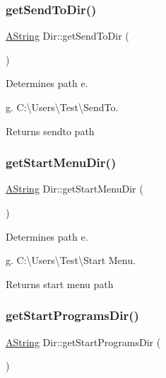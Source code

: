 \subsubsection{\texorpdfstring{getSendToDir()}{getSendToDir()}}
{\footnotesize\ttfamily \mbox{\hyperlink{class_a_string}{A\+String}} Dir\+::get\+Send\+To\+Dir (\begin{DoxyParamCaption}{ }\end{DoxyParamCaption})\hspace{0.3cm}{\ttfamily [static]}}



Determines path e. 

g. C\+:\textbackslash{}\+Users\textbackslash{}\+Test\textbackslash{}\+Send\+To. \begin{DoxyReturn}{Returns}
sendto path 
\end{DoxyReturn}
\mbox{\label{class_dir_af0b763248a679d7e44c73da89fec7f79}} 
\subsubsection{\texorpdfstring{getStartMenuDir()}{getStartMenuDir()}}
{\footnotesize\ttfamily \mbox{\hyperlink{class_a_string}{A\+String}} Dir\+::get\+Start\+Menu\+Dir (\begin{DoxyParamCaption}{ }\end{DoxyParamCaption})\hspace{0.3cm}{\ttfamily [static]}}



Determines path e. 

g. C\+:\textbackslash{}\+Users\textbackslash{}\+Test\textbackslash{}\+Start Menu. \begin{DoxyReturn}{Returns}
start menu path 
\end{DoxyReturn}
\mbox{\label{class_dir_a40e95392ecac9f2f4802555d2427a4e8}} 
\subsubsection{\texorpdfstring{getStartProgramsDir()}{getStartProgramsDir()}}
{\footnotesize\ttfamily \mbox{\hyperlink{class_a_string}{A\+String}} Dir\+::get\+Start\+Programs\+Dir (\begin{DoxyParamCaption}{ }\end{DoxyParamCaption})\hspace{0.3cm}{\ttfamily [static]}}




